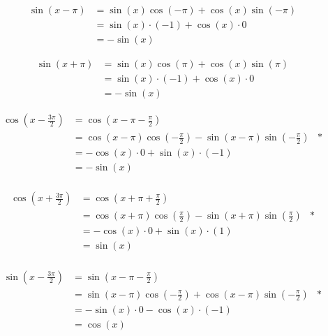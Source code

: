 \documentclass[12pt]{article} %
\newcommand*{\halfpi}{\frac{\pi}{2}}
\begin{document}
\begin{homeworkProblem}
    \begin{align*}
        \sin{(x - \pi)}
         & = \sin(x)\cos(-\pi) + \cos(x)\sin(-\pi) \\
         & = \sin(x) \cdot (-1) + \cos(x) \cdot 0  \\
         & = -\sin(x)
    \end{align*}

    \begin{align*}
        \sin{(x + \pi)}
         & = \sin(x)\cos(\pi) + \cos(x)\sin(\pi)  \\
         & = \sin(x) \cdot (-1) + \cos(x) \cdot 0 \\
         & = -\sin(x)
    \end{align*}

    \begin{align*}
        \cos{(x - \frac{3\pi}{2})}
         & = \cos(x - \pi - \halfpi)                                         \\
         & = \cos(x - \pi) \cos(-\halfpi) - \sin(x - \pi) \sin(-\halfpi) & * \\
         & = - \cos(x) \cdot 0 + \sin(x) \cdot (-1)                          \\
         & = -\sin(x)                                                        \\
    \end{align*}

    \begin{align*}
        \cos{(x + \frac{3\pi}{2})}
         & = \cos(x + \pi + \halfpi)                                       \\
         & = \cos(x + \pi) \cos(\halfpi) - \sin(x + \pi) \sin(\halfpi) & * \\
         & = - \cos(x) \cdot 0 + \sin(x) \cdot (1)                         \\
         & = \sin(x)                                                       \\
    \end{align*}

    \begin{align*}
        \sin{(x - \frac{3\pi}{2})}
         & = \sin(x - \pi - \halfpi)                                         \\
         & = \sin(x - \pi) \cos(-\halfpi) + \cos(x - \pi) \sin(-\halfpi) & * \\
         & = - \sin(x) \cdot 0 - \cos(x) \cdot (-1)                          \\
         & = \cos(x)
    \end{align*}


\end{homeworkProblem}
\end{document}
